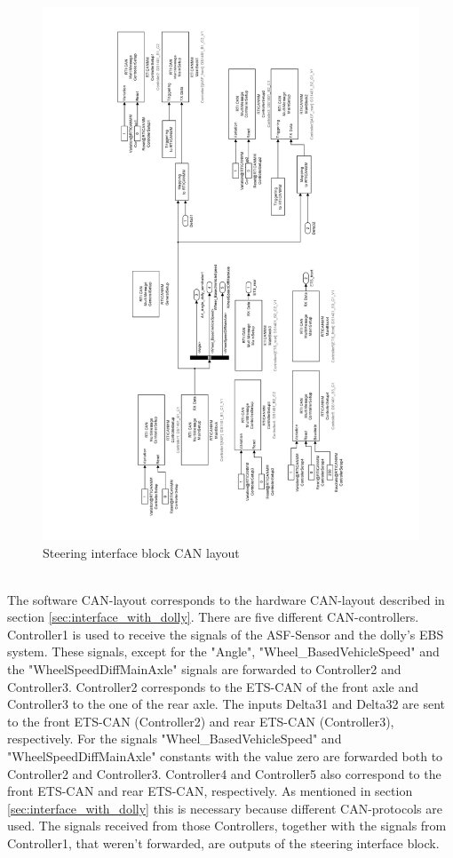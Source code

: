 \documentclass[ExampleMasters.tex]{subfiles}
\begin{document}
 \begin{figure}[h]
 	\centering
 	\includegraphics[angle=-90,width=1\linewidth]{figures/steering_interface_inside}
 	
 	\caption{Steering interface block CAN layout}
 	\label{fig:steering_interface_inside}
 \end{figure} \\
 
 The software CAN-layout corresponds to the hardware CAN-layout described in section \ref{sec:interface_with_dolly}. There are five different CAN-controllers. Controller1 is used to receive the signals of the ASF-Sensor and the dolly's EBS system. These signals, except for the "Angle", "Wheel\_BasedVehicleSpeed" and the "WheelSpeedDiffMainAxle" signals are forwarded to Controller2 and Controller3. Controller2 corresponds to the ETS-CAN of the front axle and Controller3 to the one of the rear axle. The inputs Delta31 and Delta32 are sent to the front ETS-CAN (Controller2) and rear ETS-CAN (Controller3), respectively. For the signals "Wheel\_BasedVehicleSpeed" and  "WheelSpeedDiffMainAxle" constants with the value zero are forwarded both to Controller2 and Controller3.
 Controller4 and Controller5 also correspond to the front ETS-CAN and rear ETS-CAN, respectively. As mentioned in section \ref{sec:interface_with_dolly} this is necessary because different CAN-protocols are used. The signals received from those Controllers, together with the signals from Controller1, that weren't forwarded, are outputs of the steering interface block.
 
\end{document}
